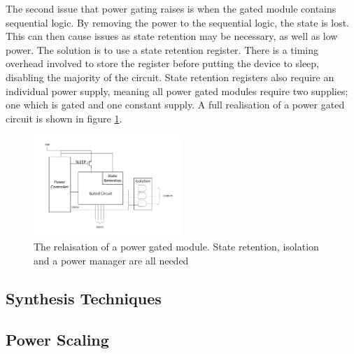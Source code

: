 The second issue that power gating raises is when the gated module contains sequential logic. 
By removing the power to the sequential logic, the state is lost. 
This can then cause issues as state retention may be necessary, as well as low power.
The solution is to use a state retention register. 
There is a timing overhead involved to store the register before putting the device to sleep, disabling the majority of the circuit. 
State retention registers also require an individual power supply, meaning all power gated modules require two supplies; one which is gated and one constant supply.
A full realisation of a power gated circuit is shown in figure \ref{fig:powergated}. 


\begin{figure}
\includegraphics[width=0.5\textwidth]{Figures/powergating_full.pdf}
\caption{The relaisation of a power gated module. State retention, isolation and a power manager are all needed}
\label{fig:powergated}
\end{figure}


\subsection{Synthesis Techniques}




\subsection{Power Scaling}

